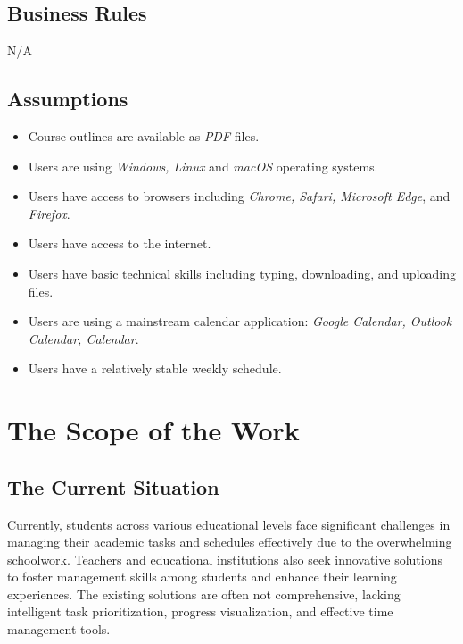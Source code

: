 \documentclass[12pt]{article}
\begin{document}
\subsection{Business Rules}
N/A
\subsection{Assumptions}
\begin{itemize}
    \item Course outlines are available as \textit{PDF} files.
    \item Users are using \textit{Windows, Linux} and \textit{macOS} operating systems.
    \item Users have access to browsers including \textit{Chrome, Safari, Microsoft Edge}, and \textit{Firefox}.
    \item Users have access to the internet.
    \item Users have basic technical skills including typing, downloading, and uploading files.
    \item Users are using a mainstream calendar application: \textit{Google Calendar, Outlook Calendar, Calendar}.
    \item Users have a relatively stable weekly schedule.
\end{itemize}


\section{The Scope of the Work}

\subsection{The Current Situation}
Currently, students across various educational levels face significant challenges in managing their academic tasks and schedules effectively due to the overwhelming schoolwork. Teachers and educational institutions also seek innovative solutions to foster management skills among students and enhance their learning experiences. The existing solutions are often not comprehensive, lacking intelligent task prioritization, progress visualization, and effective time management tools.
\end{document}
